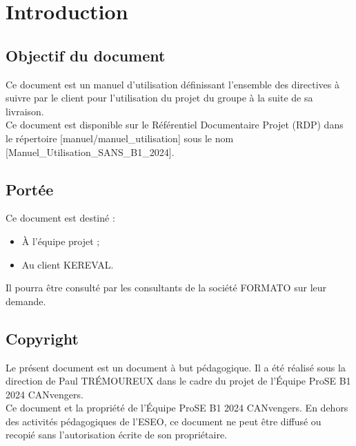 %
%
\newpage %
\section{Introduction}

\subsection{Objectif du document}
Ce document est un manuel d'utilisation définissant l'ensemble des directives à suivre par le client pour l'utilisation du projet {\guillemotleft} {\projectName} {\guillemotright} du groupe {\teamNumber} {\annee} {\guillemotleft} {\teamName} {\guillemotright} à la suite de sa livraison.\\

Ce document est disponible sur le Référentiel Documentaire Projet (RDP) dans le répertoire [manuel/manuel\_utilisation] sous le nom [Manuel\_Utilisation\_SANS\_B1\_2024].

\subsection{Portée}
Ce document est destiné :
\begin{itemize}
    \item À l'équipe projet ;
    \item Au client KEREVAL.
\end{itemize}
Il pourra être consulté par les consultants de la société FORMATO sur leur demande.

\subsection{Copyright}
Le présent document est un document à but pédagogique. Il a été réalisé sous la direction de Paul TRÉMOUREUX dans le cadre du projet de l'Équipe ProSE B1 2024 CANvengers.\\
Ce document et la propriété de l'Équipe ProSE B1 2024 CANvengers. En dehors des activités pédagogiques de l'ESEO, ce document ne peut être diffusé ou recopié sans l'autorisation écrite de son propriétaire.\\

